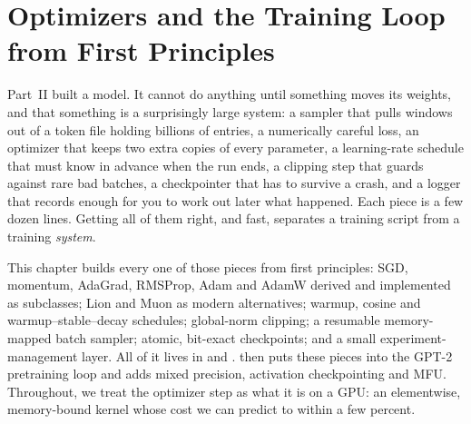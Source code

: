 \chapter{Optimizers and the Training Loop from First Principles}\label{ch:optim}

Part~II built a model. It cannot do anything until something moves its weights, and that
something is a surprisingly large system: a sampler that pulls windows out of a token file
holding billions of entries, a numerically careful loss, an optimizer that keeps two extra
copies of every parameter, a learning-rate schedule that must know in advance when the run ends,
a clipping step that guards against rare bad batches, a checkpointer that has to survive a
crash, and a logger that records enough for you to work out later what happened. Each
piece is a few dozen lines. Getting all of them right, and fast, separates a training
script from a training \emph{system}.

This chapter builds every one of those pieces from first principles: SGD, momentum, AdaGrad,
RMSProp, Adam and AdamW derived and implemented as  subclasses;
Lion and Muon as modern alternatives; warmup, cosine and warmup--stable--decay schedules;
global-norm clipping; a resumable memory-mapped batch sampler; atomic, bit-exact
checkpoints; and a small experiment-management layer. All of it lives in
 and .  then puts these pieces
into the GPT-2 pretraining loop and adds mixed precision, activation checkpointing and MFU.
Throughout, we treat the optimizer step as what it is on a GPU: an elementwise,
memory-bound kernel whose cost we can predict to within a few percent.


